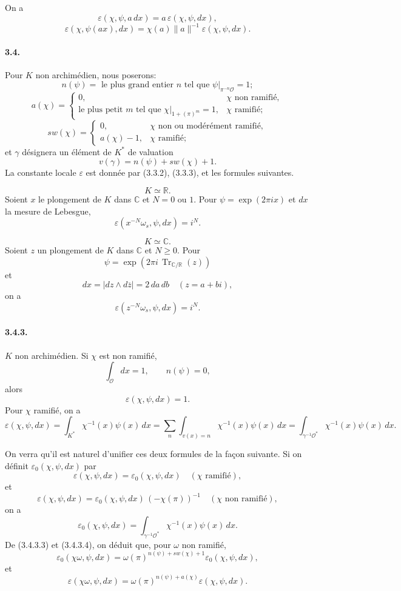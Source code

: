 \documentclass[10pt,letterpaper]{article}
\newcommand{\C}{\mathbb C}
\newcommand{\Tr}{\operatorname{Tr}}
\providecommand{\R}{\mathbb R}
\providecommand{\Tr}{\operatorname{Tr}}
\providecommand{\Tr}{\operatorname{Tr}}
\providecommand{\Tr}{\operatorname{Tr}}
\begin{document}
On a
\[
\tag{3.3.2}
\varepsilon(\chi,\psi,a\,dx)=a\,\varepsilon(\chi,\psi,dx),
\]
\[
\tag{3.3.3}
\varepsilon(\chi,\psi(ax),dx)=\chi(a)\|a\|^{-1}\varepsilon(\chi,\psi,dx).
\]

\paragraph{3.4.} Pour \(K\) non archimédien, nous poserons:
\[
n(\psi)=\text{ le plus grand entier }n\text{ tel que }\psi|_{\pi^{-n}\mathcal O}=1;
\]
\[
a(\chi)=
\begin{cases}
0,&\chi\text{ non ramifié},\\
\text{le plus petit }m\text{ tel que }\chi|_{1+(\pi)^m}=1,&\chi\text{ ramifié};
\end{cases}
\]
\[
sw(\chi)=
\begin{cases}
0,&\chi\text{ non ou modérément ramifié},\\
a(\chi)-1,&\chi\text{ ramifié};
\end{cases}
\]
et \(\gamma\) désignera un élément de \(K^*\) de valuation
\[
v(\gamma)=n(\psi)+sw(\chi)+1.
\]
La constante locale \(\varepsilon\) est donnée par (3.3.2), (3.3.3), et les formules suivantes.

\[
\tag{3.4.1}
K\simeq\R.
\]
Soient \(x\) le plongement de \(K\) dans \(\C\) et \(N=0\) ou \(1\). Pour \(\psi=\exp(2\pi ix)\) et \(dx\) la mesure de Lebesgue,
\[
\varepsilon(x^{-N}\omega_s,\psi,dx)=i^N.
\]

\[
\tag{3.4.2}
K\simeq\C.
\]
Soient \(z\) un plongement de \(K\) dans \(\C\) et \(N\ge0\). Pour
\[
\psi=\exp(2\pi i\,\Tr_{\C/\R}(z))
\]
et
\[
dx=|dz\wedge d\overline z|=2\,da\,db\quad(z=a+bi),
\]
on a
\[
\varepsilon(z^{-N}\omega_s,\psi,dx)=i^N.
\]

\paragraph{3.4.3.} \(K\) non archimédien. Si \(\chi\) est non ramifié,
\[
\int_{\mathcal O}dx=1,\qquad n(\psi)=0,
\]
alors
\[
\tag{3.4.3.1}
\varepsilon(\chi,\psi,dx)=1.
\]
Pour \(\chi\) ramifié, on a
\[
\tag{3.4.3.2}
\varepsilon(\chi,\psi,dx)=
\int_{K^*}\chi^{-1}(x)\psi(x)\,dx
=
\sum_n\int_{v(x)=n}\chi^{-1}(x)\psi(x)\,dx
=
\int_{\gamma^{-1}\mathcal O^*}\chi^{-1}(x)\psi(x)\,dx.
\]

On verra qu'il est naturel d'unifier ces deux formules de la façon suivante. Si on définit \(\varepsilon_0(\chi,\psi,dx)\) par
\[
\varepsilon(\chi,\psi,dx)=\varepsilon_0(\chi,\psi,dx)
\quad(\chi\text{ ramifié}),
\]
et
\[
\tag{3.4.3.3}
\varepsilon(\chi,\psi,dx)=\varepsilon_0(\chi,\psi,dx)\,(-\chi(\pi))^{-1}
\quad(\chi\text{ non ramifié}),
\]
on a
\[
\tag{3.4.3.4}
\varepsilon_0(\chi,\psi,dx)=
\int_{\gamma^{-1}\mathcal O^*}\chi^{-1}(x)\psi(x)\,dx.
\]
De (3.4.3.3) et (3.4.3.4), on déduit que, pour \(\omega\) non ramifié,
\[
\tag{3.4.3.5}
\varepsilon_0(\chi\omega,\psi,dx)
=
\omega(\pi)^{n(\psi)+sw(\chi)+1}\varepsilon_0(\chi,\psi,dx),
\]
et
\[
\varepsilon(\chi\omega,\psi,dx)
=
\omega(\pi)^{n(\psi)+a(\chi)}\varepsilon(\chi,\psi,dx).
\]
\end{document}
